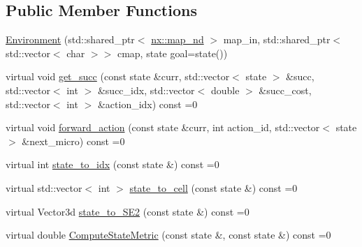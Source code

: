 \subsection*{Public Member Functions}
\begin{DoxyCompactItemize}
\item 
\hyperlink{classnx_1_1Environment_a23652067c6e2c838b7e895ada850fa6b}{Environment} (std\+::shared\+\_\+ptr$<$ \hyperlink{classnx_1_1map__nd}{nx\+::map\+\_\+nd} $>$ map\+\_\+in, std\+::shared\+\_\+ptr$<$ std\+::vector$<$ char $>$$>$ cmap, state goal=state())
\item 
virtual void \hyperlink{classnx_1_1Environment_a5879e51878691196971e94880d45b551}{get\+\_\+succ} (const state \&curr, std\+::vector$<$ state $>$ \&succ, std\+::vector$<$ int $>$ \&succ\+\_\+idx, std\+::vector$<$ double $>$ \&succ\+\_\+cost, std\+::vector$<$ int $>$ \&action\+\_\+idx) const =0
\item 
virtual void \hyperlink{classnx_1_1Environment_a4f3ee5bb7665210e6262d333857e5f4f}{forward\+\_\+action} (const state \&curr, int action\+\_\+id, std\+::vector$<$ state $>$ \&next\+\_\+micro) const =0
\item 
virtual int \hyperlink{classnx_1_1Environment_a1c558036435de03a3afd85e940aad600}{state\+\_\+to\+\_\+idx} (const state \&) const =0
\item 
virtual std\+::vector$<$ int $>$ \hyperlink{classnx_1_1Environment_adb86237d799683c40f17c95ea39eeba3}{state\+\_\+to\+\_\+cell} (const state \&) const =0
\item 
virtual Vector3d \hyperlink{classnx_1_1Environment_ae31bd7f19efac45fc07d405f1fcfd2b2}{state\+\_\+to\+\_\+\+S\+E2} (const state \&) const =0
\item 
virtual double \hyperlink{classnx_1_1Environment_a25f01903609749dc40aa5ae07c0f5e06}{Compute\+State\+Metric} (const state \&, const state \&) const =0
\end{DoxyCompactItemize}
